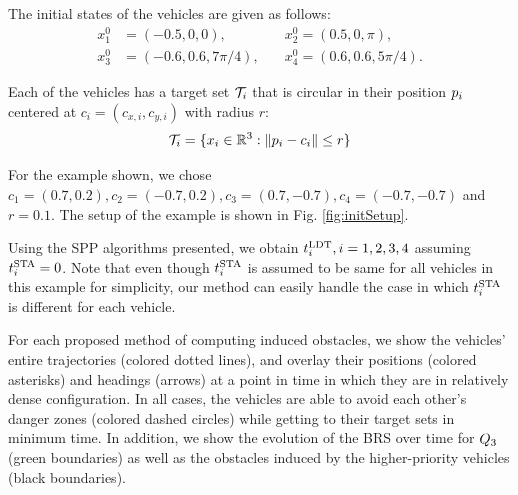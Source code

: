 The initial states of the vehicles are given as follows:
\begin{equation}
\begin{aligned}
x_1^0 &= (-0.5, 0, 0), \quad &x_2^0 = (0.5, 0, \pi), \\
x_3^0 &= \left(-0.6, 0.6, 7\pi/4\right), \quad &x_4^0 = \left(0.6, 0.6, 5\pi/4\right).
\end{aligned}
\end{equation}

\noindent Each of the vehicles has a target set $\mathcal{T}_i$ that is circular in their position $p_i$ centered at $c_i = (c_{x,i}, c_{y,i})$ with radius $r$:
\vspace{-0.2em}
\begin{equation}
\mathcal{T}_i = \{x_i \in \mathbb{R}^3: \|p_i - c_i\| \le r\}
\end{equation}

\noindent For the example shown, we chose $c_1 = (0.7, 0.2), c_2 = (-0.7, 0.2), c_3 = (0.7, -0.7), c_4 = (-0.7, -0.7)$ and $r = 0.1$. The setup of the example is shown in Fig. \ref{fig:initSetup}.

Using the SPP algorithms presented, we obtain $t^\text{LDT}_i, i=1,2,3,4$ assuming $t^\text{STA}_i=0$. Note that even though $t^\text{STA}_i$ is assumed to be same for all vehicles in this example for simplicity, our method can easily handle the case in which $t^\text{STA}_i$ is different for each vehicle.

For each proposed method of computing induced obstacles, we show the vehicles' entire trajectories (colored dotted lines), and overlay their positions (colored asterisks) and headings (arrows) at a point in time in which they are in relatively dense configuration. In all cases, the vehicles are able to avoid each other's danger zones (colored dashed circles) while getting to their target sets in minimum time. In addition, we show the evolution of the BRS over time for $Q_3$ (green boundaries) as well as the obstacles induced by the higher-priority vehicles (black boundaries).

